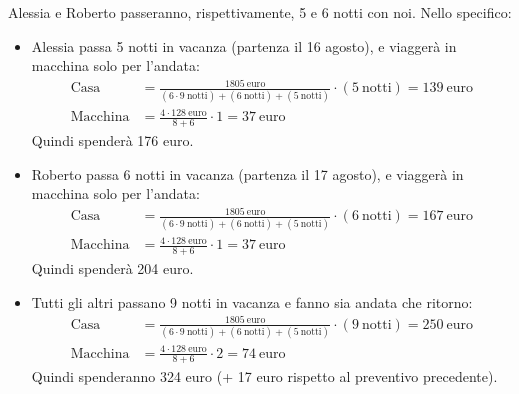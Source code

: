 \documentclass[8pt]{beamer}
\begin{document}
\begin{frame}[label={sec:orgea7172f}]{Alessia e Roberto passeranno, rispettivamente, 5 e 6 notti con noi.}
Nello specifico:
\begin{itemize}
\item \alert{Alessia} passa 5 notti in vacanza (partenza il 16 agosto), e viaggerà in macchina solo per l'andata:
\begin{align*}
  \text{Casa} &= \frac{1805\ \text{euro}}{(6 \cdot 9\ \text{notti}) + (6\ \text{notti}) + (5\ \text{notti})} \cdot (5\ \text{notti}) = 139 \ \text{euro}\\[2ex]
  \text{Macchina} &= \frac{4\cdot 128\ \text{euro}}{8 + 6} \cdot 1 = 37\ \text{euro}
\end{align*}
Quindi spenderà \alert{176 euro}.
\item \alert{Roberto} passa 6 notti in vacanza (partenza il 17 agosto), e viaggerà in macchina solo per l'andata:
\begin{align*}
  \text{Casa} &= \frac{1805\ \text{euro}}{(6 \cdot 9\ \text{notti}) + (6\ \text{notti}) + (5\ \text{notti})} \cdot (6\ \text{notti}) = 167\ \text{euro} \\[2ex]
  \text{Macchina} &= \frac{4\cdot 128\ \text{euro}}{8 + 6} \cdot 1 = 37\ \text{euro}
\end{align*}
Quindi spenderà \alert{204 euro}.
\item \alert{Tutti gli altri} passano 9 notti in vacanza e fanno sia andata che ritorno:
\begin{align*}
  \text{Casa} &= \frac{1805\ \text{euro}}{(6 \cdot 9\ \text{notti}) + (6\ \text{notti}) + (5\ \text{notti})} \cdot (9\ \text{notti}) = 250\ \text{euro}\\[2ex]
  \text{Macchina} &= \frac{4\cdot 128\ \text{euro}}{8 + 6} \cdot 2 = 74\ \text{euro}
\end{align*}
Quindi spenderanno \alert{324 euro} (+ 17 euro rispetto al preventivo precedente).
\end{itemize}
\end{frame}
\end{document}
